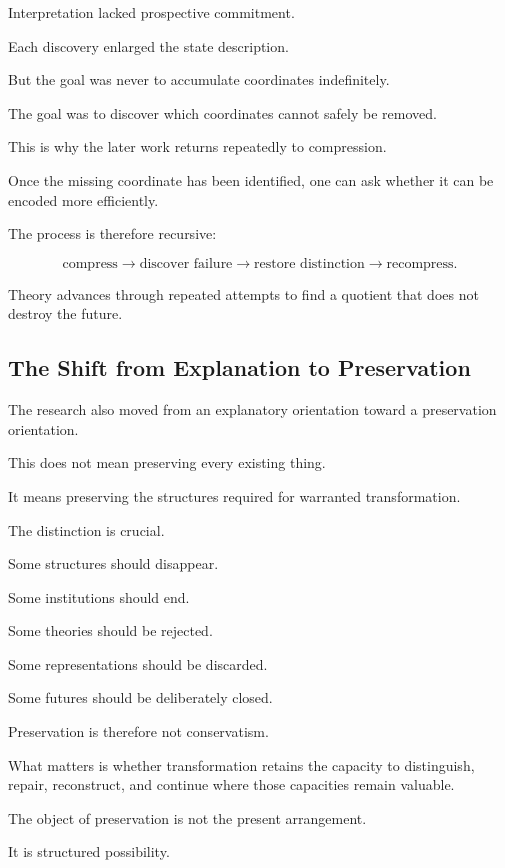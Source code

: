 \documentclass[11pt]{article}
\theoremstyle{remark}
\begin{document}
Interpretation lacked prospective commitment.

Each discovery enlarged the state description.

But the goal was never to accumulate coordinates indefinitely.

The goal was to discover which coordinates cannot safely be removed.

This is why the later work returns repeatedly to compression.

Once the missing coordinate has been identified, one can ask whether it can be
encoded more efficiently.

The process is therefore recursive:

\begin{equation}
\text{compress}
\rightarrow
\text{discover failure}
\rightarrow
\text{restore distinction}
\rightarrow
\text{recompress}.
\end{equation}

Theory advances through repeated attempts to find a quotient that does not
destroy the future.

\subsection{The Shift from Explanation to Preservation}

The research also moved from an explanatory orientation toward a preservation
orientation.

This does not mean preserving every existing thing.

It means preserving the structures required for warranted transformation.

The distinction is crucial.

Some structures should disappear.

Some institutions should end.

Some theories should be rejected.

Some representations should be discarded.

Some futures should be deliberately closed.

Preservation is therefore not conservatism.

What matters is whether transformation retains the capacity to distinguish,
repair, reconstruct, and continue where those capacities remain valuable.

The object of preservation is not the present arrangement.

It is structured possibility.
\end{document}

